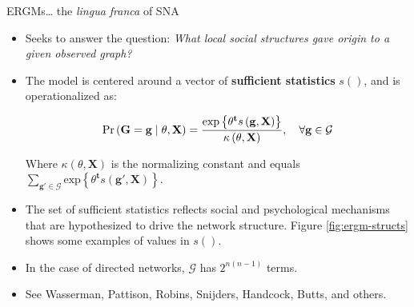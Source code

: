 \documentclass[10pt,ignorenonframetext,aspectratio=169,]{beamer}
\newcommand{\Prcond}[2]{{\mbox{Pr}\left(#1\vphantom{#2}\;\right|\left.\vphantom{#1}#2\right)}}
\newcommand{\sufstats}[1]{s\left(#1\right)}
\renewcommand{\exp}[1]{\mbox{exp}\left\{#1\right\}}
\newcommand{\transpose}[1]{{#1}^\mathbf{t}}
\newcommand{\params}{\theta}
\newcommand{\Graph}{\mathbf{G}}
\newcommand{\graph}{\mathbf{g}}
\newcommand{\GRAPH}{\mathcal{G}}
\newcommand{\Indepvar}{\mathbf{X}}
\begin{document}
\begin{frame}{ERGMs\ldots{} the \textit{lingua franca} of SNA}
\protect\hypertarget{ergms-the-of-sna}{}

\begin{itemize}
\item
  Seeks to answer the question:
  \emph{What local social structures gave origin to a given observed graph?}\pause
\item
  The model is centered around a vector of
  \textbf{sufficient statistics} \(\sufstats{}\), and is operationalized
  as:

  \begin{equation}
    \Prcond{\Graph = \graph}{\params, \Indepvar} = \frac{%
        \exp{\transpose{\params}\sufstats{\graph, \Indepvar}}%
    }{
        \kappa\left(\params, \Indepvar\right)
    },\quad\forall \graph\in\GRAPH\label{eq:ergm}
  \end{equation}

  Where \(\kappa\left(\params, \Indepvar\right)\) is the normalizing
  constant and equals
  \(\sum_{\graph'\in\GRAPH}\exp{\transpose{\params}\sufstats{\graph', \Indepvar}}\).
  \pause
\item
  The set of sufficient statistics reflects social and psychological
  mechanisms that are hypothesized to drive the network structure.
  Figure \autoref{fig:ergm-structs} shows some examples of values in
  \(\sufstats{}\).\pause
\item
  In the case of directed networks, \(\GRAPH\) has \(2^{n(n-1)}\)
  terms.\pause
\item
  See Wasserman, Pattison, Robins, Snijders, Handcock, Butts, and
  others.
\end{itemize}

\end{frame}
\end{document}
